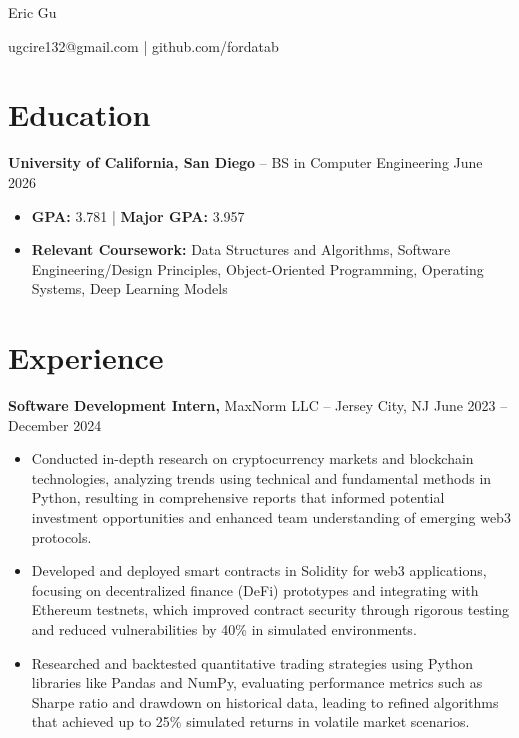 \documentclass[11pt]{article}       %
\begin{document}
\centerline{\Huge Eric Gu}

\vspace{-4pt}

\centerline{{ugcire132@gmail.com} |  {github.com/fordatab}}

\vspace{-18.5pt}

\section*{Education}
\textbf{University of California, San Diego} -- BS in Computer Engineering  \hfill June 2026\begin{itemize}[leftmargin=*, nosep]
    \item \textbf{GPA:} 3.781 | \textbf{Major GPA:} 3.957
    \item \textbf{Relevant Coursework:} Data Structures and Algorithms, Software Engineering/Design Principles, Object-Oriented Programming, Operating Systems, Deep Learning Models
\end{itemize}


\vspace{-18.5pt}

\section*{Experience}
\textbf{Software Development Intern,} {MaxNorm LLC} -- Jersey City, NJ \hfill June 2023 -- December 2024 \
\vspace{-9pt}
\begin{itemize}
\item Conducted in-depth research on cryptocurrency markets and blockchain technologies, analyzing trends using technical and fundamental methods in Python, resulting in comprehensive reports that informed potential investment opportunities and enhanced team understanding of emerging web3 protocols.
\item Developed and deployed smart contracts in Solidity for web3 applications, focusing on decentralized finance (DeFi) prototypes and integrating with Ethereum testnets, which improved contract security through rigorous testing and reduced vulnerabilities by 40\% in simulated environments.
\item Researched and backtested quantitative trading strategies using Python libraries like Pandas and NumPy, evaluating performance metrics such as Sharpe ratio and drawdown on historical data, leading to refined algorithms that achieved up to 25\% simulated returns in volatile market scenarios.
\end{itemize}
\end{document}
